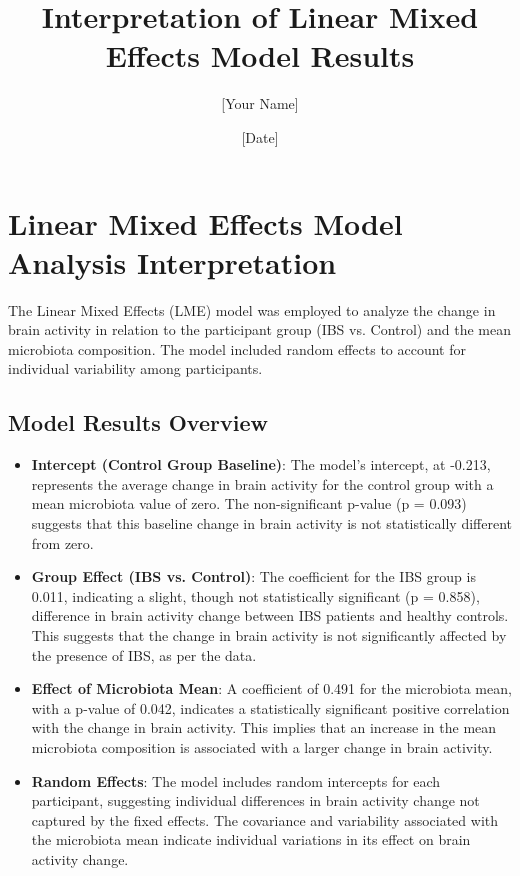 \documentclass[11pt,a4paper]{article}
\begin{document}
\title{Interpretation of Linear Mixed Effects Model Results}
\author{[Your Name]}
\date{[Date]}

\maketitle

\section*{Linear Mixed Effects Model Analysis Interpretation}

The Linear Mixed Effects (LME) model was employed to analyze the change in brain activity in relation to the participant group (IBS vs. Control) and the mean microbiota composition. The model included random effects to account for individual variability among participants.

\subsection*{Model Results Overview}

\begin{itemize}
    \item \textbf{Intercept (Control Group Baseline)}: The model's intercept, at -0.213, represents the average change in brain activity for the control group with a mean microbiota value of zero. The non-significant p-value (p = 0.093) suggests that this baseline change in brain activity is not statistically different from zero.
    
    \item \textbf{Group Effect (IBS vs. Control)}: The coefficient for the IBS group is 0.011, indicating a slight, though not statistically significant (p = 0.858), difference in brain activity change between IBS patients and healthy controls. This suggests that the change in brain activity is not significantly affected by the presence of IBS, as per the data.
    
    \item \textbf{Effect of Microbiota Mean}: A coefficient of 0.491 for the microbiota mean, with a p-value of 0.042, indicates a statistically significant positive correlation with the change in brain activity. This implies that an increase in the mean microbiota composition is associated with a larger change in brain activity.
    
    \item \textbf{Random Effects}: The model includes random intercepts for each participant, suggesting individual differences in brain activity change not captured by the fixed effects. The covariance and variability associated with the microbiota mean indicate individual variations in its effect on brain activity change.
\end{itemize}
\end{document}
